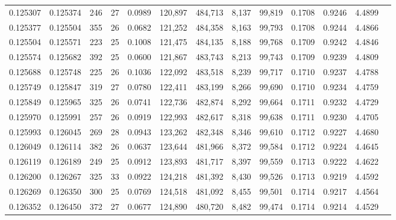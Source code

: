 \begin{tabular}{rrrrrrrrrrrrr}
0.125307 & 0.125374 &   246 &  27 &                                     0.0989 & 120,897 & 484,713 &   8,137 &  99,819 & 0.1708 & 0.9246 & 4.4899 \\
0.125377 & 0.125504 &   355 &  26 &                                     0.0682 & 121,252 & 484,358 &   8,163 &  99,793 & 0.1708 & 0.9244 & 4.4866 \\
0.125504 & 0.125571 &   223 &  25 &                                     0.1008 & 121,475 & 484,135 &   8,188 &  99,768 & 0.1709 & 0.9242 & 4.4846 \\
0.125574 & 0.125682 &   392 &  25 &                                     0.0600 & 121,867 & 483,743 &   8,213 &  99,743 & 0.1709 & 0.9239 & 4.4809 \\
0.125688 & 0.125748 &   225 &  26 &                                     0.1036 & 122,092 & 483,518 &   8,239 &  99,717 & 0.1710 & 0.9237 & 4.4788 \\
0.125749 & 0.125847 &   319 &  27 &                                     0.0780 & 122,411 & 483,199 &   8,266 &  99,690 & 0.1710 & 0.9234 & 4.4759 \\
0.125849 & 0.125965 &   325 &  26 &                                     0.0741 & 122,736 & 482,874 &   8,292 &  99,664 & 0.1711 & 0.9232 & 4.4729 \\
0.125970 & 0.125991 &   257 &  26 &                                     0.0919 & 122,993 & 482,617 &   8,318 &  99,638 & 0.1711 & 0.9230 & 4.4705 \\
0.125993 & 0.126045 &   269 &  28 &                                     0.0943 & 123,262 & 482,348 &   8,346 &  99,610 & 0.1712 & 0.9227 & 4.4680 \\
0.126049 & 0.126114 &   382 &  26 &                                     0.0637 & 123,644 & 481,966 &   8,372 &  99,584 & 0.1712 & 0.9224 & 4.4645 \\
0.126119 & 0.126189 &   249 &  25 &                                     0.0912 & 123,893 & 481,717 &   8,397 &  99,559 & 0.1713 & 0.9222 & 4.4622 \\
0.126200 & 0.126267 &   325 &  33 &                                     0.0922 & 124,218 & 481,392 &   8,430 &  99,526 & 0.1713 & 0.9219 & 4.4592 \\
0.126269 & 0.126350 &   300 &  25 &                                     0.0769 & 124,518 & 481,092 &   8,455 &  99,501 & 0.1714 & 0.9217 & 4.4564 \\
0.126352 & 0.126450 &   372 &  27 &                                     0.0677 & 124,890 & 480,720 &   8,482 &  99,474 & 0.1714 & 0.9214 & 4.4529 \\

\end{tabular}

